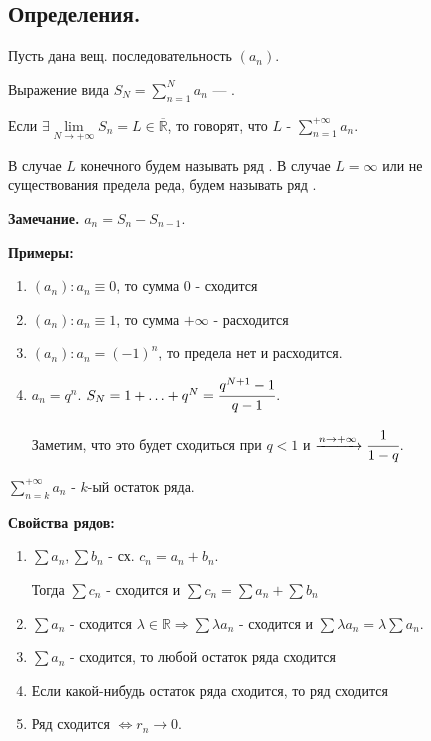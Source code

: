 \subsection{Определения.}

 Пусть дана вещ. последовательность $(a_n)$. 

Выражение вида $S_N  = \sum\limits_{n=1}^N a_n$ --- .

Если $\exists \lim\limits_{N \rightarrow +\infty}S_n = L \in \overline{\mathbb{R}}$, то говорят, что $L$ -  $\sum\limits_{n=1}^{+\infty}a_n$.

В случае $L$ конечного будем называть ряд . В случае $L = \infty$ или не существования предела реда, будем называть ряд .  

\textbf{Замечание.}  $a_n = S_n - S_{n-1}$.

\textbf{Примеры:}
\begin{enumerate}
    \item $(a_n): a_n \equiv 0$, то сумма $0$ - сходится
    \item $(a_n): a_n \equiv 1$, то сумма $+\infty$ - расходится
    \item $(a_n): a_n = (-1)^n$, то предела нет и расходится.
    \item $a_n = q^n$. $S_N = 1+\ldots + q^N =\cfrac{q^{N+1}-1}{q-1}$.
    
    Заметим, что это будет сходиться при $q<1$ и $\xrightarrow{n \rightarrow +\infty} \cfrac{1}{1-q}$. 
\end{enumerate}

$\sum\limits_{n=k}^{+\infty} a_n$ - $k$-ый остаток ряда.

\textbf{Свойства рядов:}

\begin{enumerate}
    \item $\sum a_n , \sum b_n$ - сх. $c_n = a_n + b_n$.

        Тогда $\sum c_n$ - сходится и $\sum c_n = \sum a_n + \sum b_n$
    \item $\sum a_n$  - сходится $\lambda\in \mathbb{R} \Rightarrow \sum\lambda a_n$ - сходится и $\sum \lambda a_n = \lambda \sum a_n$.
    \item $\sum a_n$ - сходится, то любой остаток ряда сходится
    \item Если какой-нибудь остаток ряда сходится, то ряд сходится
    \item Ряд сходится $\Leftrightarrow r_n \rightarrow 0 $.
\end{enumerate}

